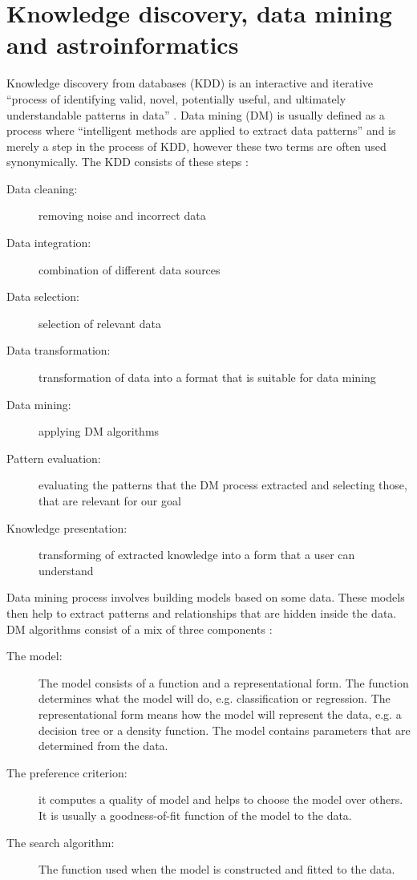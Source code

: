 \documentclass[thesis=B,english]{FITthesis}[2012/10/20]
\begin{document}
\chapter{Knowledge discovery, data mining and astroinformatics}
\label{chap:DM}
Knowledge discovery from databases (KDD) is an interactive and iterative ``process of identifying valid, novel, potentially useful, and ultimately understandable patterns in data'' \cite{andrassyova1999knowledge,Fayyad96thekdd}. Data mining (DM) is usually defined as a process where ``intelligent methods are applied to extract data patterns'' \cite{han2006data} and is merely a step in the process of KDD, however these two terms are often used synonymically. The KDD consists of these steps \cite{han2006data}:
\begin{description}
	\item[Data cleaning:] removing noise and incorrect data
	\item[Data integration:] combination of different data sources
	\item[Data selection:] selection of relevant data
	\item[Data transformation:] transformation of data into a format that is suitable for data mining
	\item[Data mining:] applying DM algorithms
	\item[Pattern evaluation:] evaluating the patterns that the DM process extracted and selecting those, that are relevant for our goal
	\item[Knowledge presentation:] transforming of extracted knowledge into a form that a user can understand
\end{description}

Data mining process involves building models based on some data. These models then help to extract patterns and relationships that are hidden inside the data. DM algorithms consist of a mix of three components \cite{Fayyad96thekdd}:
\begin{description}
\item [The model:] The model consists of a function and a representational form. The function determines what the model will do, e.g. classification or regression. The representational form means how the model will represent the data, e.g. a decision tree or a density function. The model contains parameters that are determined from the data.
\item [The preference criterion:] it computes a quality of model and helps to choose the model over others. It is usually a goodness-of-fit function of the model to the data.
\item [The search algorithm:] The function used when the model is constructed and fitted to the data.
\end{description}
\end{document}
